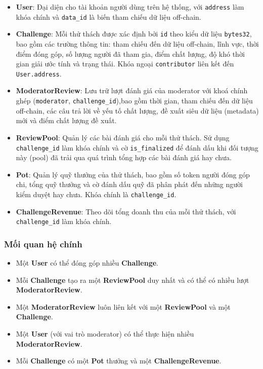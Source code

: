 \begin{itemize}
  \item \textbf{User}: Đại diện cho tài khoản người dùng trên hệ thống, với \texttt{address} làm khóa chính và \texttt{data\_id} là biến tham chiếu dữ liệu off-chain.
  \item \textbf{Challenge}: Mỗi thử thách được xác định bởi \texttt{id} theo kiểu dữ liệu \texttt{bytes32}, bao gồm các trường thông tin: tham chiếu đến dữ liệu off-chain, lĩnh vực, thời điểm đóng góp, số lượng người đã tham gia, điểm chất lượng, độ khó thời gian giải ước tính và trạng thái. Khóa ngoại \texttt{contributor} liên kết đến \texttt{User.address}.
  \item \textbf{ModeratorReview}: Lưu trữ lượt đánh giá của moderator với khoá chính ghép (\texttt{moderator}, \texttt{challenge\_id}),bao gồm thời gian, tham chiếu đến dữ liệu off-chain, các câu trả lời về yếu tố chất lượng, đề xuất siêu dữ liệu (metadata) mới và điểm chất lượng đề xuất.
  \item \textbf{ReviewPool}: Quản lý các bài đánh giá cho mỗi thử thách. Sử dụng \texttt{challenge\_id} làm khóa chính và cờ \texttt{is\_finalized} để đánh dấu khi đối tượng này (pool) đã trải qua quá trình tổng hợp các bài đánh giá hay chưa.
  \item \textbf{Pot}: Quản lý quỹ thưởng của thử thách, bao gồm số token người đóng góp chi, tổng quỹ thưởng và cờ đánh dấu quỹ đã phân phát đến những người kiểm duyệt hay chưa. Khóa chính là \texttt{challenge\_id}.
  \item \textbf{ChallengeRevenue}: Theo dõi tổng doanh thu của mỗi thử thách, với \texttt{challenge\_id} làm khóa chính.
\end{itemize}

\subsubsection{Mối quan hệ chính}

\begin{itemize}
  \item Một \textbf{User} có thể đóng góp nhiều \textbf{Challenge}.
  \item Mỗi \textbf{Challenge} tạo ra một \textbf{ReviewPool} duy nhất và có thể có nhiều lượt \textbf{ModeratorReview}.
  \item Một \textbf{ModeratorReview} luôn liên kết với một \textbf{ReviewPool} và một \textbf{Challenge}.
  \item Một \textbf{User} (với vai trò moderator) có thể thực hiện nhiều \textbf{ModeratorReview}.
  \item Mỗi \textbf{Challenge} có một \textbf{Pot} thưởng và một \textbf{ChallengeRevenue}.
\end{itemize}

